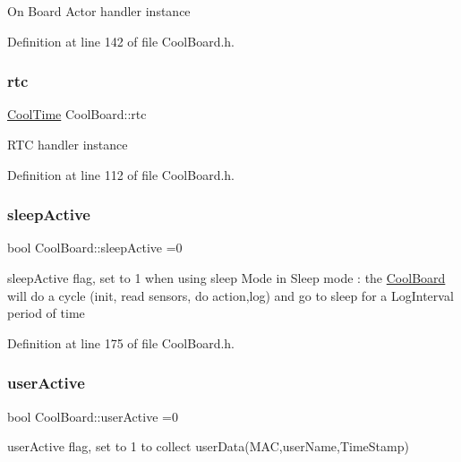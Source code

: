 On Board Actor handler instance 

Definition at line 142 of file Cool\+Board.\+h.

\mbox{\label{class_cool_board_a50d2a6716879d64a85f3c6b44ad63275}} 
\subsubsection{\texorpdfstring{rtc}{rtc}}
{\footnotesize\ttfamily \hyperlink{class_cool_time}{Cool\+Time} Cool\+Board\+::rtc\hspace{0.3cm}{\ttfamily [private]}}

R\+TC handler instance 

Definition at line 112 of file Cool\+Board.\+h.

\mbox{\label{class_cool_board_a0a51b2287139f66c738101fb53139230}} 
\subsubsection{\texorpdfstring{sleep\+Active}{sleepActive}}
{\footnotesize\ttfamily bool Cool\+Board\+::sleep\+Active =0\hspace{0.3cm}{\ttfamily [private]}}

sleep\+Active flag, set to 1 when using sleep Mode in Sleep mode \+: the \hyperlink{class_cool_board}{Cool\+Board} will do a cycle (init, read sensors, do action,log) and go to sleep for a Log\+Interval period of time 

Definition at line 175 of file Cool\+Board.\+h.

\mbox{\label{class_cool_board_a6395459131d6889a3005f79c7a35e964}} 
\subsubsection{\texorpdfstring{user\+Active}{userActive}}
{\footnotesize\ttfamily bool Cool\+Board\+::user\+Active =0\hspace{0.3cm}{\ttfamily [private]}}

user\+Active flag, set to 1 to collect user\+Data(\+M\+A\+C,user\+Name,\+Time\+Stamp) 

